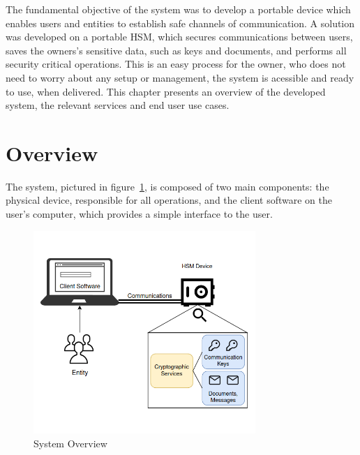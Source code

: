 \cleardoublepage
\label{chap:arch}

The fundamental objective of the system was to develop a portable device which enables users and entities to establish safe channels of communication.
A solution was developed on a portable \ac{HSM}, which secures communications between users, saves the owners's sensitive data, such as keys and documents, and performs all security critical operations. This is an easy process for the owner, who does not need to worry about any setup or management, the system is acessible and ready to use, when delivered.
This chapter presents an overview of the developed system, the relevant services and end user use cases.


\section{Overview}\label{chap:arch:overview}

The system, pictured in figure~\ref{fig:overview}, is composed of two main components: the physical device, responsible for all operations, and the client software on the user's computer, which provides a simple interface to the user.

\begin{figure}[h]
    \centering
    \includegraphics[width=0.75\textwidth]{./Images/overview.png}
    \caption{System Overview}
    \label{fig:overview}
\end{figure}

